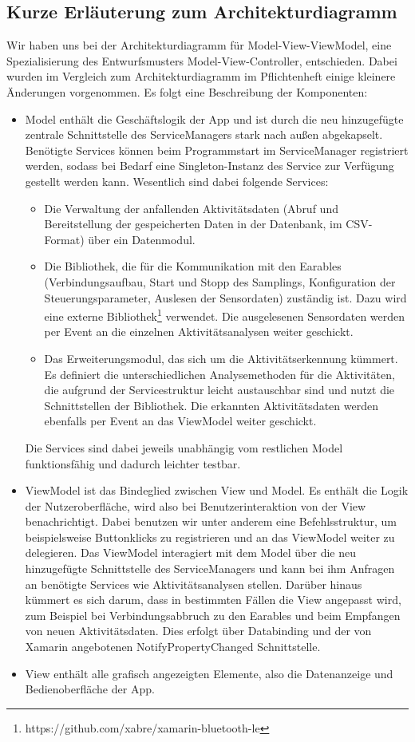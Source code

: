 \documentclass[a4paper,12pt]{article}
\begin{document}
	\subsection{Kurze Erläuterung zum Architekturdiagramm}
Wir haben uns bei der Architekturdiagramm für \textsf{Model-View-ViewModel}, eine Spezialisierung des Entwurfsmusters Model-View-Controller, entschieden. Dabei wurden im Vergleich zum Architekturdiagramm im Pflichtenheft einige kleinere Änderungen vorgenommen. Es folgt eine Beschreibung der Komponenten:
  \begin{itemize}
 	\item \textsf{\glqq Model\grqq{}} enthält die Geschäftslogik der App und ist durch die neu hinzugefügte zentrale Schnittstelle des ServiceManagers stark nach außen abgekapselt. Benötigte Services können beim Programmstart im ServiceManager registriert werden, sodass bei Bedarf eine Singleton-Instanz des Service zur Verfügung gestellt werden kann. Wesentlich sind dabei folgende Services: 
\begin{itemize}
      \item Die Verwaltung der anfallenden Aktivitätsdaten (Abruf und Bereitstellung der gespeicherten Daten in der Datenbank, im CSV-Format) über ein Datenmodul.
      \item Die Bibliothek, die für die Kommunikation mit den \Gls{Earables} (Verbindungsaufbau, Start und Stopp des Samplings, Konfiguration der \Gls{Steuerungsparameter}, Auslesen der Sensordaten) zuständig ist. Dazu wird eine externe Bibliothek\footnote{https://github.com/xabre/xamarin-bluetooth-le} verwendet. Die ausgelesenen Sensordaten werden per Event an die einzelnen Aktivitätsanalysen weiter geschickt. 
      \item Das Erweiterungsmodul, das sich um die Aktivitätserkennung kümmert. Es definiert die unterschiedlichen Analysemethoden für die Aktivitäten, die aufgrund der Servicestruktur leicht austauschbar sind und nutzt die Schnittstellen der Bibliothek. Die erkannten Aktivitätsdaten werden ebenfalls per Event an das ViewModel weiter geschickt. 
\end{itemize}
Die Services sind dabei jeweils unabhängig vom restlichen Model funktionsfähig und dadurch leichter testbar.
\item \textsf{\glqq ViewModel\grqq{}} ist das Bindeglied zwischen View und Model. Es enthält die Logik der Nutzeroberfläche, wird also bei Benutzerinteraktion von der View benachrichtigt. Dabei benutzen wir unter anderem eine Befehlsstruktur, um beispielsweise Buttonklicks zu registrieren und an das ViewModel weiter zu delegieren. Das ViewModel interagiert mit dem Model über die neu hinzugefügte Schnittstelle des ServiceManagers und kann bei ihm Anfragen an benötigte Services wie Aktivitätsanalysen stellen. Darüber hinaus kümmert es sich darum, dass in bestimmten Fällen die View angepasst wird, zum Beispiel bei Verbindungsabbruch zu den \Gls{Earables} und beim Empfangen von neuen Aktivitätsdaten. Dies erfolgt über Databinding und der von Xamarin angebotenen NotifyPropertyChanged Schnittstelle.

\item \textsf{\glqq View\grqq{}} enthält alle grafisch angezeigten Elemente, also die Datenanzeige und Bedienoberfläche der App.
\end{itemize}
\end{document}
